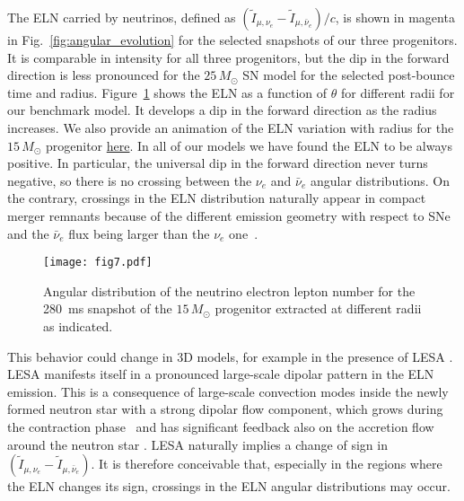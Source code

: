 \documentclass[iop,twocolappendix,numberedappendix]{emulateapj}
\begin{document}
The ELN carried by neutrinos, defined as
$(\tilde{I}_{\mu,\nu_e}-\tilde{I}_{\mu,\bar{\nu}_e})/c$, is shown in magenta in Fig.~\ref{fig:angular_evolution}
for the selected snapshots of our three progenitors. It is comparable in intensity for all three progenitors, but
the dip in the forward direction is less pronounced for the $25\,M_\odot$ SN model for the selected post-bounce time
and radius.
Figure~\ref{fig:ELN} shows the ELN as a function of $\theta$ for different radii for our 
benchmark model. It
develops a  dip in the forward direction as the radius increases. We also
provide an animation of the ELN variation with radius for the $15\,M_\odot$
progenitor \href{http://wwwmpa.mpa-garching.mpg.de/ccsnarchive/data/Tamborra2017/}
{here}. In all of our models we have found
the ELN to be always positive. In particular, the universal dip in the
forward direction never turns negative, so there is no crossing between the
$\nu_e$ and $\bar\nu_e$ angular distributions. On the contrary, crossings in the ELN
distribution naturally appear in compact merger
remnants because of the different emission geometry with respect to SNe and the 
$\bar{\nu}_e$ flux being larger than the $\nu_e$ one~\citep{Wu:2017qpc}.

\begin{figure}
\begin{center}
  \texttt{[image: fig7.pdf]}
  \caption{Angular distribution of the neutrino electron lepton number for the
  280~ms snapshot of the $15\,M_\odot$ progenitor extracted at different
  radii as indicated.
  }
   \label{fig:ELN}
\end{center}
\end{figure}

This behavior could change in 3D models, for example in the
presence of LESA 
\citep[Lepton-Emission Self-sustained Asymmetry;][]{Tamborra:2014aua}. 
 LESA manifests itself in a 
  pronounced large-scale dipolar pattern in the ELN emission.
  This is a consequence of large-scale convection modes 
  inside the newly formed neutron star with a strong dipolar
  flow component, which grows during the contraction phase~\citep{Janka:2016fox}
  and has significant feedback also on the accretion
  flow around the neutron star \citep{Tamborra:2014aua}. 
LESA naturally implies a change of sign in
  $(\tilde{I}_{\mu,\nu_e}-\tilde{I}_{\mu,\bar{\nu}_e})$.  It is
  therefore conceivable that, especially in the regions where the ELN
  changes its sign, crossings in the ELN angular distributions may
  occur.
\end{document}
